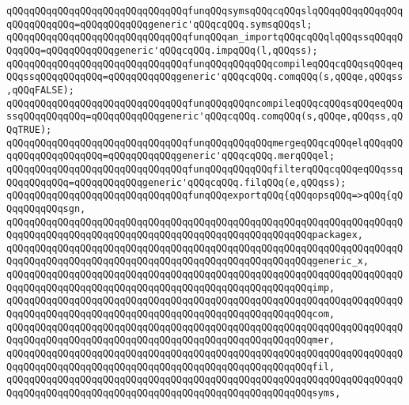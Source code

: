 \newline
\verb|qQQqqQQqqQQqqQQqqQQqqQQqqQQqqQQqfunqQQqsymsqQQqcqQQqslqQQqqQQqqQQqqQQqqQQqqQQqqQQq=qQQqqQQqqQQqgeneric'qQQqcqQQq.symsqQQqsl;|\newline
\verb|qQQqqQQqqQQqqQQqqQQqqQQqqQQqqQQqfunqQQqan_importqQQqcqQQqlqQQqssqQQqqQQqqQQq=qQQqqQQqqQQqgeneric'qQQqcqQQq.impqQQq(l,qQQqss);|\newline
\newline
\verb|qQQqqQQqqQQqqQQqqQQqqQQqqQQqqQQqfunqQQqqQQqqQQqcompileqQQqcqQQqsqQQqeqQQqssqQQqqQQqqQQq=qQQqqQQqqQQqgeneric'qQQqcqQQq.comqQQq(s,qQQqe,qQQqss,qQQqFALSE);|\newline
\verb|qQQqqQQqqQQqqQQqqQQqqQQqqQQqqQQqfunqQQqqQQqncompileqQQqcqQQqsqQQqeqQQqssqQQqqQQqqQQq=qQQqqQQqqQQqgeneric'qQQqcqQQq.comqQQq(s,qQQqe,qQQqss,qQQqTRUE);|\newline
\newline
\verb|qQQqqQQqqQQqqQQqqQQqqQQqqQQqqQQqfunqQQqqQQqqQQqmergeqQQqcqQQqelqQQqqQQqqQQqqQQqqQQqqQQq=qQQqqQQqqQQqgeneric'qQQqcqQQq.merqQQqel;|\newline
\verb|qQQqqQQqqQQqqQQqqQQqqQQqqQQqqQQqfunqQQqqQQqqQQqfilterqQQqcqQQqeqQQqssqQQqqQQqqQQq=qQQqqQQqqQQqgeneric'qQQqcqQQq.filqQQq(e,qQQqss);|\newline
\newline
\verb|qQQqqQQqqQQqqQQqqQQqqQQqqQQqqQQqfunqQQqexportqQQq{qQQqopsqQQq=>qQQq{qQQqqQQqqQQqsgn,|\newline
\verb|qQQqqQQqqQQqqQQqqQQqqQQqqQQqqQQqqQQqqQQqqQQqqQQqqQQqqQQqqQQqqQQqqQQqqQQqqQQqqQQqqQQqqQQqqQQqqQQqqQQqqQQqqQQqqQQqqQQqqQQqqQQqpackagex,|\newline
\verb|qQQqqQQqqQQqqQQqqQQqqQQqqQQqqQQqqQQqqQQqqQQqqQQqqQQqqQQqqQQqqQQqqQQqqQQqqQQqqQQqqQQqqQQqqQQqqQQqqQQqqQQqqQQqqQQqqQQqqQQqqQQqgeneric_x,|\newline
\verb|qQQqqQQqqQQqqQQqqQQqqQQqqQQqqQQqqQQqqQQqqQQqqQQqqQQqqQQqqQQqqQQqqQQqqQQqqQQqqQQqqQQqqQQqqQQqqQQqqQQqqQQqqQQqqQQqqQQqqQQqqQQqimp,|\newline
\verb|qQQqqQQqqQQqqQQqqQQqqQQqqQQqqQQqqQQqqQQqqQQqqQQqqQQqqQQqqQQqqQQqqQQqqQQqqQQqqQQqqQQqqQQqqQQqqQQqqQQqqQQqqQQqqQQqqQQqqQQqqQQqcom,|\newline
\verb|qQQqqQQqqQQqqQQqqQQqqQQqqQQqqQQqqQQqqQQqqQQqqQQqqQQqqQQqqQQqqQQqqQQqqQQqqQQqqQQqqQQqqQQqqQQqqQQqqQQqqQQqqQQqqQQqqQQqqQQqqQQqmer,|\newline
\verb|qQQqqQQqqQQqqQQqqQQqqQQqqQQqqQQqqQQqqQQqqQQqqQQqqQQqqQQqqQQqqQQqqQQqqQQqqQQqqQQqqQQqqQQqqQQqqQQqqQQqqQQqqQQqqQQqqQQqqQQqqQQqfil,|\newline
\verb|qQQqqQQqqQQqqQQqqQQqqQQqqQQqqQQqqQQqqQQqqQQqqQQqqQQqqQQqqQQqqQQqqQQqqQQqqQQqqQQqqQQqqQQqqQQqqQQqqQQqqQQqqQQqqQQqqQQqqQQqqQQqsyms,|\newline
